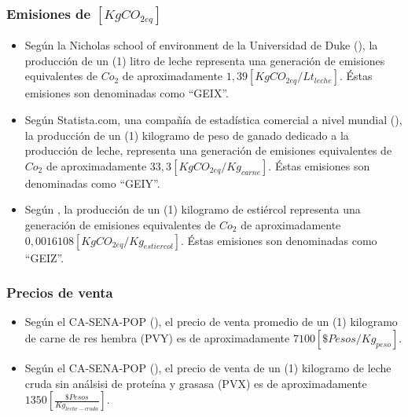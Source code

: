 \subsubsection{Emisiones de $[KgCO_{2eq}]$}

\begin{itemize}
    \item Según la Nicholas school of environment de la Universidad de Duke (\cite{ecoduke}), la producción de un (1) litro de leche representa una generación de  emisiones equivalentes de $Co_{2}$ de aproximadamente $1,39[KgCO_{2eq}/Lt_{leche}]$. Éstas emisiones son denominadas como ``GEIX''.
    \item Según Statista.com, una compañía de estadística comercial a nivel mundial (\cite{statista}), la producción de un (1) kilogramo de peso de ganado dedicado a la producción de leche, representa una generación de  emisiones equivalentes de $Co_{2}$ de aproximadamente $33,3[KgCO_{2eq}/Kg_{carne}]$. Éstas emisiones son denominadas como ``GEIY''.
    \item Según \cite{manure}, la producción de un (1) kilogramo de estiércol representa una generación de  emisiones equivalentes de $Co_{2}$ de aproximadamente $0,0016108[KgCO_{2eq}/Kg_{estiercol}]$. Éstas emisiones son denominadas como ``GEIZ''.
\end{itemize}
\subsubsection{Precios de venta}
\begin{itemize}
    \item Según el CA-SENA-POP (\cite{casena}), el precio  de venta promedio de un (1) kilogramo de carne de res hembra (PVY) es de aproximadamente $7100[\$Pesos/Kg_{peso}]$. 
    \item Según el CA-SENA-POP (\cite{casena}), el precio de venta de un (1) kilogramo de leche cruda sin análsisi de proteína y grasasa (PVX) es de aproximadamente $1350[\frac{\$Pesos}{Kg_{leche-cruda}}]$.
\end{itemize}

